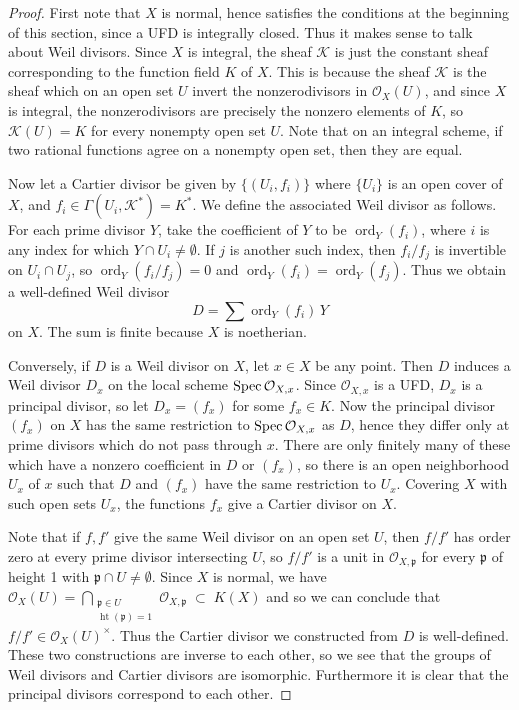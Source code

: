 \documentclass[12pt]{article}
\begin{document}
\begin{proof}
    First note that \(X\) is normal, hence satisfies the conditions at the beginning of this section, since a UFD is integrally closed. Thus it makes sense to talk about Weil divisors. Since \(X\) is integral, the sheaf \(\mathcal{K}\) is just the constant sheaf corresponding to the function field \(K\) of \(X\). This is because the sheaf $\mathcal{K}$ is the sheaf which on an open set $U$ invert the nonzerodivisors in $\mathcal{O}_X(U)$, and since $X$ is integral, the nonzerodivisors are precisely the nonzero elements of $K$, so $\mathcal{K}(U) = K$ for every nonempty open set $U$. Note that on an integral scheme, if two rational functions agree on a nonempty open set, then they are equal.

    Now let a Cartier divisor be given by \(\{(U_i,f_i)\}\) where \(\{U_i\}\) is an open cover of \(X\), and \(f_i\in \Gamma(U_i,\mathcal{K}^*)=K^*\). We define the associated Weil divisor as follows. For each prime divisor \(Y\), take the coefficient of \(Y\) to be \(\operatorname{ord}_Y(f_i)\), where \(i\) is any index for which \(Y\cap U_i\neq \emptyset\). If \(j\) is another such index, then \(f_i/f_j\) is invertible on \(U_i\cap U_j\), so \(\operatorname{ord}_Y(f_i/f_j)=0\) and \(\operatorname{ord}_Y(f_i)=\operatorname{ord}_Y(f_j)\). Thus we obtain a well-defined Weil divisor
    \[
        D=\sum \operatorname{ord}_Y(f_i)\,Y
    \]
    on \(X\). The sum is finite because \(X\) is noetherian.

    Conversely, if \(D\) is a Weil divisor on \(X\), let \(x\in X\) be any point. Then \(D\) induces a Weil divisor \(D_x\) on the local scheme \(\operatorname{Spec} \mathcal{O}_{X,x}\). Since \(\mathcal{O}_{X,x}\) is a UFD, \(D_x\) is a principal divisor, so let
    $D_x = (f_x)$
    for some \(f_x\in K\). Now the principal divisor \((f_x)\) on \(X\) has the same restriction to \(\operatorname{Spec} \mathcal{O}_{X,x}\) as \(D\), hence they differ only at prime divisors which do not pass through \(x\). There are only finitely many of these which have a nonzero coefficient in \(D\) or \((f_x)\), so there is an open neighborhood \(U_x\) of \(x\) such that \(D\) and \((f_x)\) have the same restriction to \(U_x\). Covering \(X\) with such open sets \(U_x\), the functions \(f_x\) give a Cartier divisor on \(X\).

    Note that if \(f,f'\) give the same Weil divisor on an open set \(U\), then $f/f'$ has order zero at every prime divisor intersecting $U$, so $f/f'$ is a unit in $\mathcal O_{X,\mathfrak p}$ for every $\mathfrak p$ of height 1 with $\mathfrak p \cap U \neq \emptyset$. Since $X$ is normal, we have $
        \mathcal O_X(U)
        =
        \bigcap_{\substack{\mathfrak p \in U \\ \operatorname{ht}(\mathfrak p)=1}}
        \mathcal O_{X,\mathfrak p}
        \;\subset\; K(X)$
    and so we can conclude that $f/f' \in \mathcal O_X(U)^\times$. Thus the Cartier divisor we constructed from $D$ is well-defined. These two constructions are inverse to each other, so we see that the groups of Weil divisors and Cartier divisors are isomorphic. Furthermore it is clear that the principal divisors correspond to each other.
\end{proof}
\end{document}
